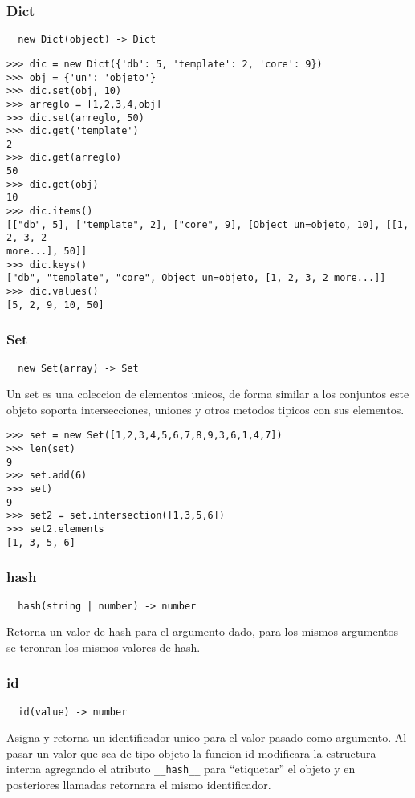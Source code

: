 \subsubsection*{Dict}
\begin{verbatim}
  new Dict(object) -> Dict
\end{verbatim}
\begin{lstlisting}[style=consola]
>>> dic = new Dict({'db': 5, 'template': 2, 'core': 9})
>>> obj = {'un': 'objeto'}
>>> dic.set(obj, 10)
>>> arreglo = [1,2,3,4,obj]
>>> dic.set(arreglo, 50)
>>> dic.get('template')
2
>>> dic.get(arreglo)
50
>>> dic.get(obj)
10
>>> dic.items()
[["db", 5], ["template", 2], ["core", 9], [Object un=objeto, 10], [[1, 2, 3, 2
more...], 50]]
>>> dic.keys()
["db", "template", "core", Object un=objeto, [1, 2, 3, 2 more...]]
>>> dic.values()
[5, 2, 9, 10, 50]
\end{lstlisting}

\subsubsection*{Set}
\begin{verbatim}
  new Set(array) -> Set
\end{verbatim}
Un set es una coleccion de elementos unicos, de forma similar a los conjuntos
este objeto soporta intersecciones, uniones y otros metodos tipicos con sus
elementos.
\begin{lstlisting}[style=consola]
>>> set = new Set([1,2,3,4,5,6,7,8,9,3,6,1,4,7])
>>> len(set)
9
>>> set.add(6)
>>> set)
9
>>> set2 = set.intersection([1,3,5,6])
>>> set2.elements
[1, 3, 5, 6]
\end{lstlisting}

\subsubsection*{hash}
\begin{verbatim}
  hash(string | number) -> number
\end{verbatim}
Retorna un valor de hash para el argumento dado, para los mismos argumentos se
teronran los mismos valores de hash.

\subsubsection*{id}
\begin{verbatim}
  id(value) -> number
\end{verbatim}
Asigna y retorna un identificador unico para el valor pasado como argumento.
Al pasar un valor que sea de tipo objeto la funcion id modificara la
estructura interna agregando el atributo \verb|__hash__| para ``etiquetar''
el objeto y en posteriores llamadas retornara el mismo identificador.

